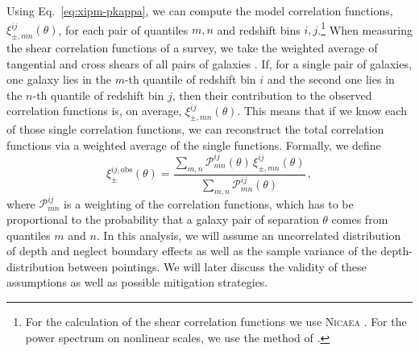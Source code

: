 \documentclass{aa}
\renewcommand{\rm}{\mathrm}
\begin{document}
Using Eq.~\eqref{eq:xipm-pkappa}, we can compute the model correlation functions, $\xi_{\pm,mn}^{ij}(\theta)$, for each pair of quantiles $m,n$ and redshift bins $i,j$.\footnote{For the calculation of the shear correlation functions we use \textsc{Nicaea} \citep{2009A&A...497..677K}. %
For the power spectrum on nonlinear scales, we use the method of \citet{2012ApJ...761..152T}.} When measuring the shear correlation functions of a survey, we take the weighted average of tangential and cross shears of all pairs of galaxies \citep[see][]{2017MNRAS.465.1454H}. If, for a single pair of galaxies, one galaxy lies in the $m$-th quantile of redshift bin $i$ and the second one lies in the $n$-th quantile of redshift bin $j$, then their contribution to the observed correlation functions is, on average, $\xi_{\pm,mn}^{ij}(\theta)$. This means that if we know each of those single correlation functions, we can reconstruct the total correlation functions via a weighted average of the single functions. Formally, we define \begin{equation}
\xi_\pm^{ij,\rm{obs}}(\theta) = \frac{\sum_{m,n} \mathcal{P}_{mn}^{ij}(\theta)\,\xi_{\pm,mn}^{ij}(\theta)}{\sum_{m,n} \mathcal{P}_{mn}^{ij}(\theta)}\, ,
\label{eq:def_xiobs}
\end{equation}
where $\mathcal{P}_{mn}^{ij}$ is a weighting of the correlation functions, which has to be proportional to the probability that a galaxy pair of separation $\theta$ comes from quantiles $m$ and $n$. In this analysis, we will assume an uncorrelated distribution of depth and neglect boundary effects as well as the sample variance of the depth-distribution between pointings. We will later discuss the validity of these assumptions as well as possible mitigation strategies. 
\end{document}
